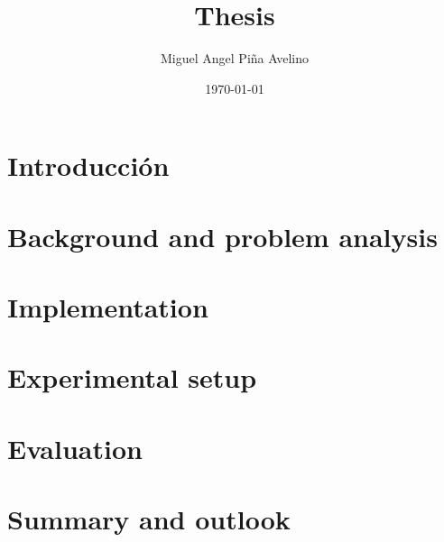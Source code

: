 \documentclass[11pt]{article}
\author{Miguel Angel Piña Avelino}
\date{\today}
\title{Thesis}
\begin{document}
\maketitle

\section{Introducción}
\section{Background and problem analysis}
\section{Implementation}
\section{Experimental setup}
\section{Evaluation}
\label{sec:evaluation}

\section{Summary and outlook}
\end{document}
